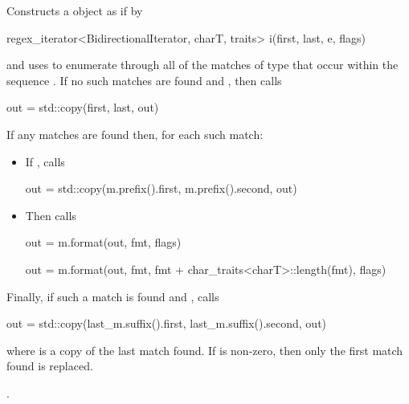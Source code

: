 \documentclass[ebook,11pt,article]{memoir}
\begin{document}
\begin{itemdescr}
\pnum
\effects
Constructs a  object 
as if by
\begin{codeblock}
regex_iterator<BidirectionalIterator, charT, traits> i(first, last, e, flags)
\end{codeblock}
and uses  to enumerate through all
of the matches  of type  
that occur within the sequence .
If no such
matches are found and
, then calls
\begin{codeblock}
out = std::copy(first, last, out)
\end{codeblock}
If any matches are found then, for each such match:
\begin{itemize}
\item
If , calls 
\begin{codeblock}
out = std::copy(m.prefix().first, m.prefix().second, out)
\end{codeblock}
\item
Then calls
\begin{codeblock}
out = m.format(out, fmt, flags)
\end{codeblock}
\begin{removedblock}
\begin{codeblock}
out = m.format(out, fmt, fmt + char_traits<charT>::length(fmt), flags)
\end{codeblock}
\end{removedblock}
\end{itemize}
Finally, if such a match
is found and ,
calls
\begin{codeblock}
out = std::copy(last_m.suffix().first, last_m.suffix().second, out)
\end{codeblock}
where  is a copy of the last match
found. If  
is non-zero, then only the first match found is replaced.

\pnum\returns  {}.
\end{itemdescr}
\end{document}
